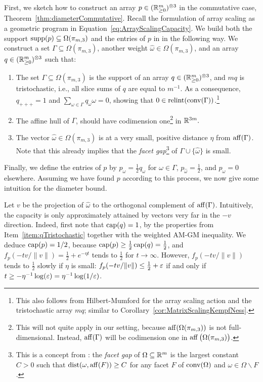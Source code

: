 First, we sketch how to construct an array $p \in (\mathbb R_{\geq 0}^m)^{\otimes 3}$ in the commutative case, Theorem~\ref{thm:diameterCommutative}.
Recall the formulation of array scaling as a geometric program in Equation~\eqref{eq:ArrayScalingCapacity}.
We build both the support $\operatorname{supp}(p) \subseteq \Omega(\pi_{m,3})$ and the entries of $p$ in \cite[Section~3]{WeightMargin} in the following way. We construct a set $\Gamma \subseteq \Omega (\pi_{m,3})$, another weight $\hat{\omega} \in \Omega(\pi_{m,3})$, and an array $q \in (\mathbb R_{\geq 0}^m)^{\otimes 3}$ such that:
\begin{enumerate}
	\item\label{item:qTristochastic} The set $\Gamma \subseteq \Omega(\pi_{m,3})$ is the support of an array $q \in (\mathbb R_{\geq 0}^m)^{\otimes 3}$, and $m q$ is tristochastic, i.e., all slice sums of $q$ are equal to $m^{-1}$.
	As a consequence, $q_{+++} = 1$ and $\sum_{\omega \in \Gamma} q_{\omega} \omega = 0$, showing that $0 \in \operatorname{relint}(\operatorname{conv}(\Gamma))$.\footnote{This also follows from Hilbert-Mumford for the array scaling action and the tristochastic array $mq$; similar to Corollary~\ref{cor:MatrixScalingKempfNess}.}
	
	\item The affine hull of $\Gamma$, should have codimension one\footnote{This will not quite apply in our setting, because $\operatorname{aff}(\Omega(\pi_{m,3}))$ is not full-dimensional. Instead, $\operatorname{aff} (\Gamma)$ will be codimension one in $\operatorname{aff}\big( \Omega(\pi_{m,3}) \big)$.} in $\mathbb R^{3m}.$
	
	\item \label{item:FacetGap} The vector $\hat{\omega} \in \Omega(\pi_{m,3})$ is at a very small, positive distance $\eta$ from $\operatorname{aff} (\Gamma)$. Note that this already implies that the \emph{facet gap}\footnote{This is a concept from \cite[Definition~1.8]{burgisser2020interior}: the \emph{facet gap} of $\Omega \subseteq \mathbb R^m$ is the largest constant $C >0$ such that $\operatorname{dist}(\omega,\operatorname{aff}(F)) \geq C$ for any facet $F$ of $\operatorname{conv}(\Omega)$ and $\omega \in \Omega \backslash F$.}
	of $\Gamma \cup \{\hat{\omega}\}$ is small.
\end{enumerate}
Finally, we define the entries of $p$ by $p_{\omega} = \frac{1}{2} q_{\omega}$ for $\omega \in \Gamma$, $p_{\hat{\omega}} = \frac{1}{2}$, and $p_\omega = 0$ elsewhere. Assuming we have found $p$ according to this process, we now give some intuition for the diameter bound.

Let $v$ be the projection of $\hat{\omega}$ to the orthogonal complement of $\operatorname{aff}(\Gamma)$. Intuitively, the capacity is only approximately attained by vectors very far in the $-v$ direction. Indeed, first note that $\operatorname{cap}(q)=1$, by the properties from Item~\ref{item:qTristochastic} together with the weighted AM-GM inequality.
We deduce $\operatorname{cap}(p) = 1/2$, because $\operatorname{cap}(p) \geq \frac{1}{2} \operatorname{cap}(q) = \frac{1}{2}$, and $f_p(- tv/\|v\|) = \frac{1}{2} + e^{ - \eta t}$ tends to $\frac 12$ for $t \to \infty$. However, $f_p( - t v/\|v\|)$ tends to $\frac 12$ slowly if $\eta$ is small: $f_p( - t v/\|v\|) \leq \frac{1}{2} + \varepsilon$ if and only if $t \geq - \eta^{-1} \log (\varepsilon) = \eta^{-1} \log(1/ \varepsilon)$.

